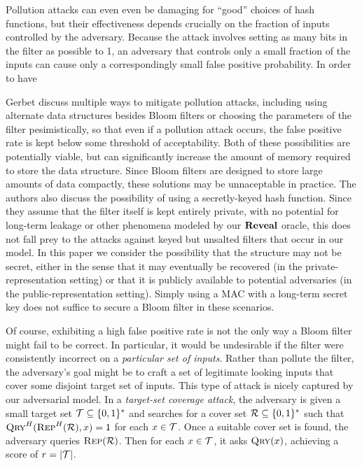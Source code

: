 %
Pollution attacks can even even be damaging for ``good'' choices of hash
functions, but their effectiveness depends crucially on the fraction of inputs
controlled by the adversary. Because the attack involves setting as many bits in
the filter as possible to 1, an adversary that controls only a small fraction of
the inputs can cause only a correspondingly small false positive probability. In
order to have 
%

Gerbet \etal discuss multiple ways to mitigate pollution attacks, including
using alternate data structures besides Bloom filters or choosing the parameters
of the filter pesimistically, so that even if a pollution attack occurs, the
false positive rate is kept below some threshold of acceptability. Both of these
possibilities are potentially viable, but can significantly increase the amount
of memory required to store the data structure. Since Bloom filters are designed
to store large amounts of data compactly, these solutions may be unnaceptable in
practice. The authors also discuss the possibility of using a secretly-keyed
hash function. Since they assume that the filter itself is kept entirely
private, with no potential for long-term leakage or other phenomena modeled by
our $\mathbf{Reveal}$ oracle, this does not fall prey to the attacks against keyed but
unsalted filters that occur in our model. In this paper we consider the
possibility that the structure may not be secret, either in the sense that it
may eventually be recovered (in the private-representation setting) or that it
is publicly available to potential adversaries (in the public-representation
setting). Simply using a MAC with a long-term secret key does not suffice to
secure a Bloom filter in these scenarios.

%
Of course, exhibiting a high false positive rate is not the only way a Bloom
filter might fail to be correct. In particular, it would be undesirable if the
filter were consistently incorrect on a \emph{particular set of inputs}. Rather
than pollute the filter, the adversary's goal might be to craft a set of
legitimate looking inputs that cover some disjoint target set of inputs.
%
This type of attack is nicely captured by our adversarial model.
%
In a \emph{target-set coverage attack}, the adversary is given a small target set
$\mathcal{T}\subseteq\{0,1\}^*$ and searches for a cover set $\mathcal{R}\subseteq\{0,1\}^*$
such that $\textnormal{\textsc{Qry}}^H(\textnormal{\textsc{Rep}}^H(\mathcal{R}),x)=1$ for each $x\in\mathcal{T}$.
%
Once a suitable cover set is found, the adversary queries $\textnormal{\textsc{Rep}}(\mathcal{R})$. Then
for each $x\in\mathcal{T}$, it asks $\textnormal{\textsc{Qry}}(x)$, achieving a score of $r = |\mathcal{T}|$.

